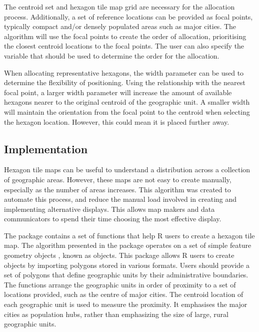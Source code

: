 The centroid set and hexagon tile map grid are necessary for the
allocation process. Additionally, a set of reference locations can be
provided as focal points, typically compact and/or densely populated
areas such as major cities. The algorithm will use the focal points to
create the order of allocation, prioritising the closest centroid
locations to the focal points. The user can also specify the variable
that should be used to determine the order for the allocation.

When allocating representative hexagons, the width parameter can be used
to determine the flexibility of positioning. Using the relationship with
the nearest focal point, a larger width parameter will increase the
amount of available hexagons nearer to the original centroid of the
geographic unit. A smaller width will maintain the orientation from the
focal point to the centroid when selecting the hexagon location.
However, this could mean it is placed further away.

\hypertarget{implementation}{%
\subsection{Implementation}\label{implementation}}

Hexagon tile maps can be useful to understand a distribution across a
collection of geographic areas. However, these maps are not easy to
create manually, especially as the number of areas increases. This
algorithm was created to automate this process, and reduce the manual
load involved in creating and implementing alternative displays. This
allows map makers and data communicators to spend their time choosing
the most effective display.

The  package contains a set of functions that help R users
to create a hexagon tile map. The algorithm presented in the
 package operates on a set of simple feature geometry
objects , known as  objects\citep{sf}. This package allows R
users to create  objects by importing polygons stored in various
formats. Users should provide a set of polygons that define geographic
units by their administrative boundaries. The functions arrange the
geographic units in order of proximity to a set of locations provided,
such as the centre of major cities. The centroid location of each
geographic unit is used to measure the proximity. It emphasises the
major cities as population hubs, rather than emphasizing the size of
large, rural geographic units.

